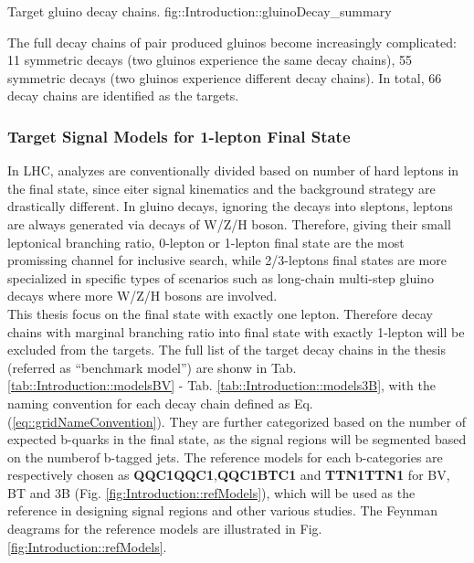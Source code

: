 {Target gluino decay chains.}
{fig::Introduction::gluinoDecay_summary}


The full decay chains of pair produced gluinos become increasingly complicated: 11 symmetric decays (two gluinos experience the same decay chains), 55 symmetric decays (two gluinos experience different decay chains).
In total, 66 decay chains are identified as the targets. \\


\subsubsection{Target Signal Models for 1-lepton Final State}
In LHC, analyzes are conventionally divided based on number of hard leptons in the final state, since eiter signal kinematics and the background strategy are drastically different. In gluino decays, ignoring the decays into sleptons, leptons are always generated via decays of W/Z/H boson. Therefore, giving their small leptonical branching ratio, 0-lepton or 1-lepton final state are the most promissing channel for inclusive search, while 2/3-leptons final states are more specialized in specific types of scenarios such as long-chain multi-step gluino decays where more W/Z/H bosons are involved. \\

This thesis focus on the final state with exactly one lepton. 
Therefore decay chains with marginal branching ratio into final state with exactly 1-lepton will be excluded from the targets. 
The full list of the target decay chains in the thesis (referred as ``benchmark model'') are shonw in Tab. \ref{tab::Introduction::modelsBV} - Tab. \ref{tab::Introduction::models3B}, with the naming convention for each decay chain defined as Eq. (\ref{eq::gridNameConvention}). They are further categorized based on the number of expected b-quarks in the final state, as the signal regions will be segmented based on the numberof b-tagged jets. The reference models for each b-categories are respectively chosen as \textbf{QQC1QQC1},\textbf{QQC1BTC1} and \textbf{TTN1TTN1} for BV, BT and 3B (Fig. \ref{fig:Introduction::refModels}), which will be used as the reference in designing signal regions and other various studies. The Feynman deagrams for the reference models are illustrated in Fig. \ref{fig:Introduction::refModels}.


